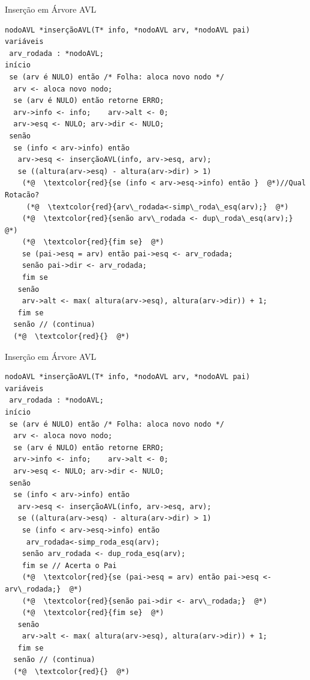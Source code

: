 \documentclass[12pt,table,xcolor={dvipsnames}]{beamer}
\begin{document}
\begin{frame}[fragile]{Inserção em Árvore AVL}
\begin{lstlisting}
nodoAVL *inserçãoAVL(T* info, *nodoAVL arv, *nodoAVL pai)
variáveis
 arv_rodada : *nodoAVL;
início
 se (arv é NULO) então /* Folha: aloca novo nodo */
  arv <- aloca novo nodo;
  se (arv é NULO) então retorne ERRO;
  arv->info <- info;	arv->alt <- 0;
  arv->esq <- NULO;	arv->dir <- NULO;
 senão
  se (info < arv->info) então
   arv->esq <- inserçãoAVL(info, arv->esq, arv);
   se ((altura(arv->esq) - altura(arv->dir) > 1)
    (*@  \textcolor{red}{se (info < arv->esq->info) então }  @*)//Qual Rotacão?
     (*@  \textcolor{red}{arv\_rodada<-simp\_roda\_esq(arv);}  @*)
    (*@  \textcolor{red}{senão arv\_rodada <- dup\_roda\_esq(arv);}  @*)
    (*@  \textcolor{red}{fim se}  @*)
    se (pai->esq = arv) então pai->esq <- arv_rodada;
    senão pai->dir <- arv_rodada;
    fim se
   senão
    arv->alt <- max( altura(arv->esq), altura(arv->dir)) + 1;
   fim se
  senão // (continua)
  (*@  \textcolor{red}{}  @*)
\end{lstlisting}
\end{frame}

\begin{frame}[fragile]{Inserção em Árvore AVL}
\begin{lstlisting}
nodoAVL *inserçãoAVL(T* info, *nodoAVL arv, *nodoAVL pai)
variáveis
 arv_rodada : *nodoAVL;
início
 se (arv é NULO) então /* Folha: aloca novo nodo */
  arv <- aloca novo nodo;
  se (arv é NULO) então retorne ERRO;
  arv->info <- info;	arv->alt <- 0;
  arv->esq <- NULO;	arv->dir <- NULO;
 senão
  se (info < arv->info) então
   arv->esq <- inserçãoAVL(info, arv->esq, arv);
   se ((altura(arv->esq) - altura(arv->dir) > 1)
    se (info < arv->esq->info) então 
     arv_rodada<-simp_roda_esq(arv);
    senão arv_rodada <- dup_roda_esq(arv);
    fim se // Acerta o Pai
    (*@  \textcolor{red}{se (pai->esq = arv) então pai->esq <- arv\_rodada;}  @*)
    (*@  \textcolor{red}{senão pai->dir <- arv\_rodada;}  @*)
    (*@  \textcolor{red}{fim se}  @*)
   senão
    arv->alt <- max( altura(arv->esq), altura(arv->dir)) + 1;
   fim se
  senão // (continua)
  (*@  \textcolor{red}{}  @*)
\end{lstlisting}
\end{frame}
\end{document}
